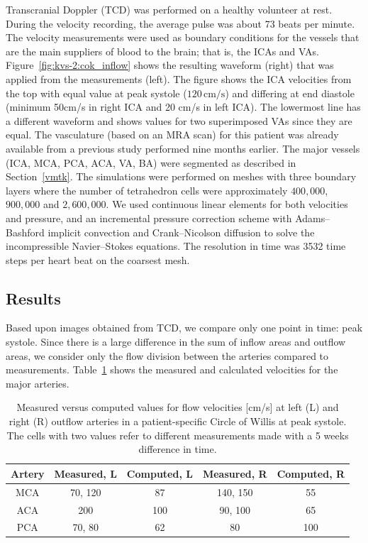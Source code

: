 Transcranial Doppler (TCD) was performed on a healthy volunteer at
rest. During the velocity recording, the average pulse was about 73
beats per minute. The velocity measurements were used as boundary
conditions for the vessels that are the main suppliers of blood to the
brain; that is, the ICAs and VAs. Figure~\ref{fig:kvs-2:cok_inflow}
shows the resulting waveform (right) that was applied from the
measurements (left). The figure shows the ICA velocities from the top
with equal value at peak systole ($120\,\mathrm{cm}/\mathrm{s}$) and
differing at end diastole (minimum 50cm/s in right ICA and 20 cm/s in
left ICA). The lowermost line has a different waveform and shows
values for two superimposed VAs since they are equal. The vasculature
(based on an MRA scan) for this patient was already available from a
previous study performed nine months earlier. The major vessels (ICA,
MCA, PCA, ACA, VA, BA) were segmented as described in
Section~\ref{vmtk}. The simulations were performed on meshes with
three boundary layers where the number of tetrahedron cells were
approximately $400,000$, $900,000$ and $2,600,000$. We used continuous
linear elements for both velocities and pressure, and an incremental
pressure correction scheme with Adams--Bashford implicit convection
and Crank--Nicolson diffusion to solve the incompressible
Navier--Stokes equations. The resolution in time was 3532 time steps
per heart beat on the coarsest mesh.

\subsection{Results}

Based upon images obtained from TCD, we compare only one point in
time: peak systole. Since there is a large difference in the sum of
inflow areas and outflow areas, we consider only the flow division
between the arteries compared to measurements.
Table~\ref{measure_vs_comp} shows the measured and calculated
velocities for the major arteries.

\begin{table}
  \center
  \begin{tabular}  {  c | c | c | c | c }
    Artery &Measured, L&Computed, L &Measured, R&Computed, R \\
    \hline
    MCA & 70, 120 		& 87  & 140, 150 	& 55	\\
    ACA & 200  		& 100  	& 90, 100 	& 65	\\
    PCA & 70, 80  		& 62 	& 80  		& 100  \\
  \end{tabular}
  \caption{Measured versus computed values for flow
    velocities [cm/s] at left (L) and right (R) outflow arteries in a patient-specific Circle of Willis at peak
    systole. The cells with two values refer to different measurements
    made with a 5 weeks difference in time.}
  \label{measure_vs_comp}
\end{table}

